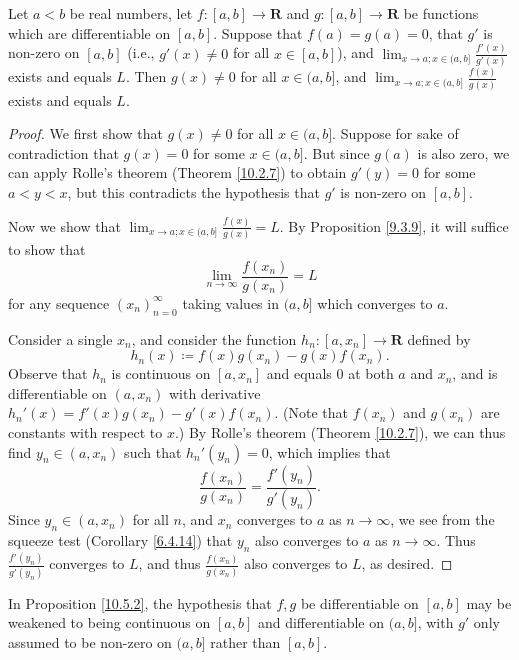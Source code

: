 \begin{proposition}\label{10.5.2}
    Let \(a < b\) be real numbers, let \(f : [a, b] \to \mathbf{R}\) and \(g : [a, b] \to \mathbf{R}\) be functions which are differentiable on \([a, b]\).
    Suppose that \(f(a) = g(a) = 0\), that \(g'\) is non-zero on \([a, b]\) (i.e., \(g'(x) \neq 0\) for all \(x \in [a, b]\)), and \(\lim_{x \to a ; x \in (a, b]} \frac{f'(x)}{g'(x)}\) exists and equals \(L\).
    Then \(g(x) \neq 0\) for all \(x \in (a, b]\), and \(\lim_{x \to a ; x \in (a, b]} \frac{f(x)}{g(x)}\) exists and equals \(L\).
\end{proposition}

\begin{proof}
    We first show that \(g(x) \neq 0\) for all \(x \in (a, b]\).
    Suppose for sake of contradiction that \(g(x) = 0\) for some \(x \in (a, b]\).
    But since \(g(a)\) is also zero, we can apply Rolle's theorem (Theorem \ref{10.2.7}) to obtain \(g'(y) = 0\) for some \(a < y < x\), but this contradicts the hypothesis that \(g'\) is non-zero on \([a, b]\).

    Now we show that \(\lim_{x \to a ; x \in (a, b]} \frac{f(x)}{g(x)} = L\).
    By Proposition \ref{9.3.9}, it will suffice to show that
    \[
        \lim_{n \to \infty} \frac{f(x_n)}{g(x_n)} = L
    \]
    for any sequence \((x_n)_{n = 0}^\infty\) taking values in \((a, b]\) which converges to \(a\).

    Consider a single \(x_n\), and consider the function \(h_n : [a, x_n] \to \mathbf{R}\) defined by
    \[
        h_n(x) \coloneqq f(x) g(x_n) - g(x) f(x_n).
    \]
    Observe that \(h_n\) is continuous on \([a, x_n]\) and equals \(0\) at both \(a\) and \(x_n\), and is differentiable on \((a, x_n)\) with derivative \(h_n'(x) = f'(x) g(x_n) - g'(x) f(x_n)\).
    (Note that \(f(x_n)\) and \(g(x_n)\) are constants with respect to \(x\).)
    By Rolle's theorem (Theorem \ref{10.2.7}), we can thus find \(y_n \in (a, x_n)\) such that \(h_n'(y_n) = 0\), which implies that
    \[
        \frac{f(x_n)}{g(x_n)} = \frac{f'(y_n)}{g'(y_n)}.
    \]
    Since \(y_n \in (a, x_n)\) for all \(n\), and \(x_n\) converges to \(a\) as \(n \to \infty\), we see from the squeeze test (Corollary \ref{6.4.14}) that \(y_n\) also converges to \(a\) as \(n \to \infty\).
    Thus \(\frac{f'(y_n)}{g'(y_n)}\) converges to \(L\), and thus \(\frac{f(x_n)}{g(x_n)}\) also converges to \(L\), as desired.
\end{proof}

\begin{note}
    In Proposition \ref{10.5.2}, the hypothesis that \(f, g\) be differentiable on \([a, b]\) may be weakened to being continuous on \([a, b]\) and differentiable on \((a, b]\), with \(g'\) only assumed to be non-zero on \((a, b]\) rather than \([a, b]\).
\end{note}

